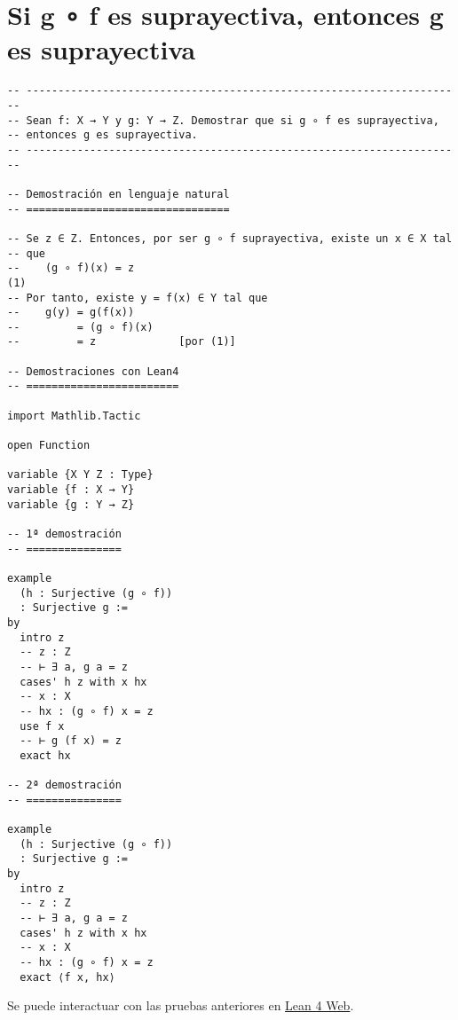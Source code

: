 \section{Si g ∘ f es suprayectiva, entonces g es suprayectiva}
\label{sec:orgd432542}
\begin{verbatim}
-- ---------------------------------------------------------------------
-- Sean f: X → Y y g: Y → Z. Demostrar que si g ∘ f es suprayectiva,
-- entonces g es suprayectiva.
-- ---------------------------------------------------------------------

-- Demostración en lenguaje natural
-- ================================

-- Se z ∈ Z. Entonces, por ser g ∘ f suprayectiva, existe un x ∈ X tal
-- que
--    (g ∘ f)(x) = z                                                 (1)
-- Por tanto, existe y = f(x) ∈ Y tal que
--    g(y) = g(f(x))
--         = (g ∘ f)(x)
--         = z             [por (1)]

-- Demostraciones con Lean4
-- ========================

import Mathlib.Tactic

open Function

variable {X Y Z : Type}
variable {f : X → Y}
variable {g : Y → Z}

-- 1ª demostración
-- ===============

example
  (h : Surjective (g ∘ f))
  : Surjective g :=
by
  intro z
  -- z : Z
  -- ⊢ ∃ a, g a = z
  cases' h z with x hx
  -- x : X
  -- hx : (g ∘ f) x = z
  use f x
  -- ⊢ g (f x) = z
  exact hx

-- 2ª demostración
-- ===============

example
  (h : Surjective (g ∘ f))
  : Surjective g :=
by
  intro z
  -- z : Z
  -- ⊢ ∃ a, g a = z
  cases' h z with x hx
  -- x : X
  -- hx : (g ∘ f) x = z
  exact ⟨f x, hx⟩
\end{verbatim}
Se puede interactuar con las pruebas anteriores en \href{https://lean.math.hhu.de/\#url=https://raw.githubusercontent.com/jaalonso/Calculemus2/main/src/Suprayectiva\_si\_lo\_es\_la\_composicion.lean}{Lean 4 Web}.

